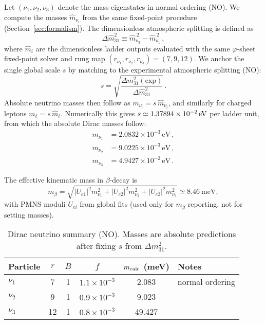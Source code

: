 \documentclass[%
amsmath,amssymb,
aps,
prb,
floatfix,showkeys
]{revtex4-2}
\begin{document}
Let $(\nu_1,\nu_2,\nu_3)$ denote the mass eigenstates in normal ordering (NO). We compute the masses $\widehat m_{\nu_i}$ from the same fixed-point procedure (Section~\ref{sec:formalism}). The dimensionless atmospheric splitting is defined as
\begin{equation}
  \Delta \widehat m^2_{31} \equiv \widehat m_{\nu_3}^{\,2} - \widehat m_{\nu_1}^{\,2}\,,
  \label{eq:dimless_atmo}
\end{equation}
where $\widehat m_i$ are the dimensionless ladder outputs evaluated with the same $\varphi$-sheet fixed-point solver and rung map $(r_{\nu_1},r_{\nu_2},r_{\nu_3})=(7,9,12)$. We anchor the single global scale $s$ by matching to the experimental atmospheric splitting (NO):
\begin{equation}
  s = \sqrt{\frac{\Delta m^2_{31}(\mathrm{exp})}{\Delta \widehat m^2_{31}}}\,.
  \label{eq:nu_global_scale}
\end{equation}
Absolute neutrino masses then follow as $m_{\nu_i}=s\,\widehat m_{\nu_i}$, and similarly for charged leptons $m_\ell=s\,\widehat m_\ell$. Numerically this gives $s \simeq 1.37894\times10^{-2}\,{\rm eV}$ per ladder unit, from which the absolute Dirac masses follow:
\begin{align}
m_{\nu_1} &= 2.0832\times10^{-3}\,\text{eV}\,,\nonumber\\
m_{\nu_2} &= 9.0225\times10^{-3}\,\text{eV}\,,\\
m_{\nu_3} &= 4.9427\times10^{-2}\,\text{eV}\,.\nonumber
\end{align}

The effective kinematic mass in $\beta$-decay is
\begin{equation}
  m_\beta = \sqrt{|U_{e1}|^2 m_{\nu_1}^2 + |U_{e2}|^2 m_{\nu_2}^2 + |U_{e3}|^2 m_{\nu_3}^2} \simeq 8.46~\text{meV},
  \label{eq:mbeta_def}
\end{equation}
with PMNS moduli $U_{ei}$ from global fits \cite{NuFIT52} (used only for $m_\beta$ reporting, not for setting masses).

\begin{table}[H]
\caption{Dirac neutrino summary (NO). Masses are absolute predictions after fixing $s$ from $\Delta m^2_{31}$.}
\label{tab:neutrinos}
\begin{tabular}{l c c c c l}
\hline
Particle & $r$ & $B$ & $f$ & $m_{\rm calc}$ (meV) & Notes \\
\hline
$\nu_1$ & 7  & 1 & $1.1\times10^{-3}$ & 2.083 & normal ordering \\
$\nu_2$ & 9  & 1 & $0.9\times10^{-3}$ & 9.023 &  \\
$\nu_3$ & 12 & 1 & $0.8\times10^{-3}$ & 49.427 &  \\
\hline
\end{tabular}
\end{table}
\end{document}
